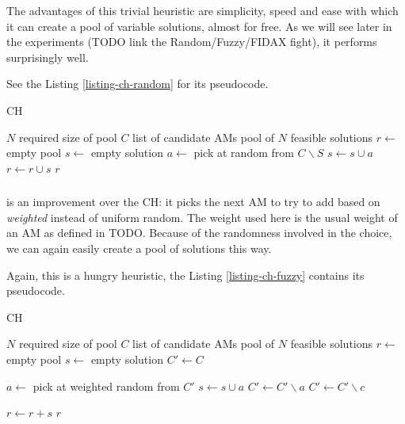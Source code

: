 The advantages of this trivial heuristic are simplicity, speed and ease with which it can create a pool of variable solutions, almost for free. As we will see later in the experiments (TODO link the Random/Fuzzy/FIDAX fight), it performs surprisingly well.

See the Listing \ref{listing-ch-random} for its pseudocode.

\begin{algorithm}
\caption{ CH}
\label{listing-ch-random}
\begin{algorithmic}
\REQUIRE $N$ required size of pool
\REQUIRE $C$ list of candidate AMs
\ENSURE pool of $N$ feasible solutions
\STATE $r \gets $ empty pool
  \STATE {}
  \STATE $s \gets $ empty solution
    \STATE $a \gets $ pick at random from $C \backslash S$
    \STATE $s \gets s \cup a$
  \ENDWHILE
  \STATE $r \gets r \cup s$
\ENDFOR
\RETURN $r$
\end{algorithmic}
\end{algorithm}

\subsubsection{}
\label{heu-ch-fuzzy}

 is an improvement over the  CH: it picks the next AM to try to add based on \textit{weighted} instead of uniform random. The weight used here is the usual weight of an AM as defined in TODO. Because of the randomness involved in the choice, we can again easily create a pool of solutions this way.

Again, this is a hungry heuristic, the Listing \ref{listing-ch-fuzzy} contains its pseudocode.


\begin{algorithm}
\caption{ CH}
\label{listing-ch-fuzzy}
\begin{algorithmic}
\REQUIRE $N$ required size of pool
\REQUIRE $C$ list of candidate AMs
\ENSURE pool of $N$ feasible solutions
\STATE $r \gets $ empty pool
  \STATE {}
  \STATE $s \gets $ empty solution
  \STATE $C' \gets C$

    \STATE $a \gets $ pick at weighted random from $C'$
      \STATE $s \gets s \cup a$
      \STATE $C' \gets C' \backslash a$
    \ENDIF
        \STATE {}
        \STATE $C' \gets C' \backslash c$
      \ENDIF
    \ENDFOR
  \ENDWHILE

  \STATE $r \gets r + s$
\ENDFOR
\RETURN $r$
\end{algorithmic}
\end{algorithm}

